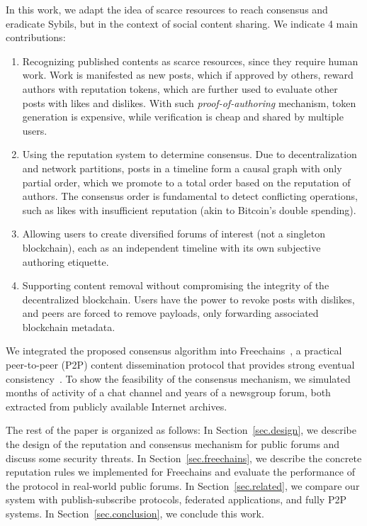 \documentclass[12pt]{article}
\newcommand{\FC}       {Freechains\xspace}
\begin{document}
In this work, we adapt the idea of scarce resources to reach consensus and
eradicate Sybils, but in the context of social content sharing.
We indicate 4 main contributions:
%
\begin{enumerate}
\item Recognizing published contents as scarce resources, since they require
human work.
Work is manifested as new posts, which if approved by others, reward authors
with reputation tokens, which are further used to evaluate other posts with
likes and dislikes.
With such \emph{proof-of-authoring} mechanism, token generation is expensive,
while verification is cheap and shared by multiple users.
%
\item Using the reputation system to determine consensus.
Due to decentralization and network partitions, posts in a timeline form a
causal graph with only partial order, which we promote to a total order based
on the reputation of authors.
The consensus order is fundamental to detect conflicting operations, such as
likes with insufficient reputation (akin to Bitcoin's double spending).
%
\item Allowing users to create diversified forums of interest (not a
singleton blockchain), each as an independent timeline with its own
subjective authoring etiquette.
%
\item Supporting content removal without compromising the integrity of the
decentralized blockchain.
Users have the power to revoke posts with dislikes, and peers are forced to
remove payloads, only forwarding associated blockchain metadata.
\end{enumerate}
%
We integrated the proposed consensus algorithm into \FC~\cite{fcs.sbseg20}, a
practical peer-to-peer (P2P) content dissemination protocol that provides
strong eventual consistency~\cite{p2p.sec}.
To show the feasibility of the consensus mechanism, we simulated months of
activity of a chat channel and years of a newsgroup forum, both extracted from
publicly available Internet archives.

The rest of the paper is organized as follows:
In Section~\ref{sec.design}, we describe the design of the reputation and
consensus mechanism for public forums and discuss some security threats.
In Section~\ref{sec.freechains}, we describe the concrete reputation rules we
implemented for \FC and evaluate the performance of the protocol in real-world
public forums.
In Section~\ref{sec.related}, we compare our system with publish-subscribe
protocols, federated applications, and fully P2P systems.
In Section~\ref{sec.conclusion}, we conclude this work.
\end{document}
